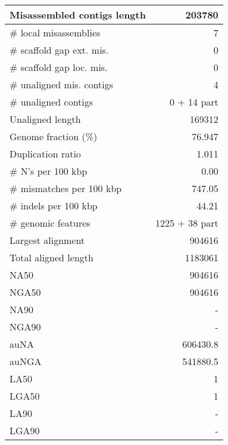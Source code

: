 \documentclass[12pt,a4paper]{article}
\begin{document}
\begin{table}[ht]
\begin{center}
\begin{tabular}{|l*{1}{|r}|}
Misassembled contigs length & 203780 \\ \hline
\# local misassemblies & 7 \\ \hline
\# scaffold gap ext. mis. & 0 \\ \hline
\# scaffold gap loc. mis. & 0 \\ \hline
\# unaligned mis. contigs & 4 \\ \hline
\# unaligned contigs & 0 + 14 part \\ \hline
Unaligned length & 169312 \\ \hline
Genome fraction (\%) & 76.947 \\ \hline
Duplication ratio & 1.011 \\ \hline
\# N's per 100 kbp & 0.00 \\ \hline
\# mismatches per 100 kbp & 747.05 \\ \hline
\# indels per 100 kbp & 44.21 \\ \hline
\# genomic features & 1225 + 38 part \\ \hline
Largest alignment & 904616 \\ \hline
Total aligned length & 1183061 \\ \hline
NA50 & 904616 \\ \hline
NGA50 & 904616 \\ \hline
NA90 & - \\ \hline
NGA90 & - \\ \hline
auNA & 606430.8 \\ \hline
auNGA & 541880.5 \\ \hline
LA50 & 1 \\ \hline
LGA50 & 1 \\ \hline
LA90 & - \\ \hline
LGA90 & - \\ \hline
\end{tabular}
\end{center}
\end{table}
\end{document}
